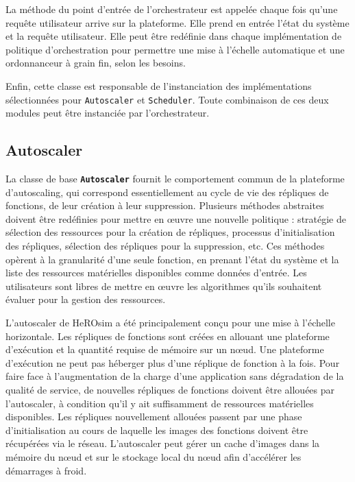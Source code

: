 La méthode du point d'entrée de l'orchestrateur est appelée chaque fois qu'une requête utilisateur arrive sur la plateforme. Elle prend en entrée l'état du système et la requête utilisateur. Elle peut être redéfinie dans chaque implémentation de politique d'orchestration pour permettre une mise à l'échelle automatique et une ordonnanceur à grain fin, selon les besoins.

Enfin, cette classe est responsable de l'instanciation des implémentations sélectionnées pour \texttt{Autoscaler} et \texttt{Scheduler}. Toute combinaison de ces deux modules peut être instanciée par l'orchestrateur.

\subsection{Autoscaler}

La classe de base \textbf{\texttt{Autoscaler}} fournit le comportement commun de la plateforme d'autoscaling, qui correspond essentiellement au cycle de vie des répliques de fonctions, de leur création à leur suppression. Plusieurs méthodes abstraites doivent être redéfinies pour mettre en œuvre une nouvelle politique : stratégie de sélection des ressources pour la création de répliques, processus d'initialisation des répliques, sélection des répliques pour la suppression, etc. Ces méthodes opèrent à la granularité d'une seule fonction, en prenant l'état du système et la liste des ressources matérielles disponibles comme données d'entrée. Les utilisateurs sont libres de mettre en œuvre les algorithmes qu'ils souhaitent évaluer pour la gestion des ressources.

L'autoscaler de HeROsim a été principalement conçu pour une mise à l'échelle horizontale. Les répliques de fonctions sont créées en allouant une plateforme d'exécution et la quantité requise de mémoire sur un nœud. Une plateforme d'exécution ne peut pas héberger plus d'une réplique de fonction à la fois. Pour faire face à l'augmentation de la charge d'une application sans dégradation de la qualité de service, de nouvelles répliques de fonctions doivent être allouées par l'autoscaler, à condition qu'il y ait suffisamment de ressources matérielles disponibles. Les répliques nouvellement allouées passent par une phase d'initialisation au cours de laquelle les images des fonctions doivent être récupérées via le réseau. L'autoscaler peut gérer un cache d'images dans la mémoire du nœud et sur le stockage local du nœud afin d'accélérer les démarrages à froid.

